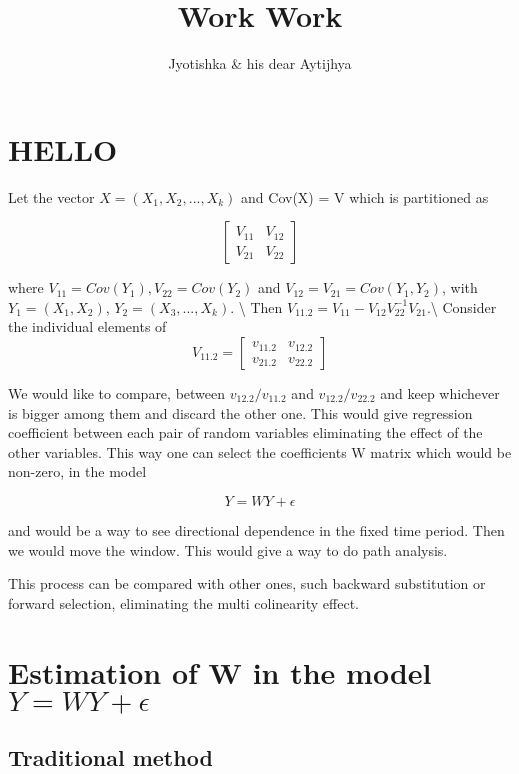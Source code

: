 \documentclass[
  12pt,
]{article}
\title{Work Work}
\author{Jyotishka \& his dear Aytijhya}
\date{}
\begin{document}
\maketitle


\hypertarget{hello}{%
\section{HELLO}\label{hello}}

Let the vector \(X = (X_1, X_2, . . . , X_k)\) and Cov(X) = V which is
partitioned as

\[\begin{bmatrix}
V_{11} & V_{12}\\
V_{21} & V_{22}
\end{bmatrix}\]

where \(V_{11} = Cov(Y_1), V_{22} = Cov(Y_2)\) and
\(V_{12} = V_{21} = Cov(Y_1, Y_2)\), with \(Y_1 = (X_1, X_2)\),
\(Y_2 = (X_3, . . . , X_k)\). \textbackslash{} Then
\(V_{11.2} = V_{11} - V_{12}V_{22}^{-1}V_{21}\).\textbackslash{}
Consider the individual elements of \[V_{11.2} =
\begin{bmatrix}
v_{11.2} & v_{12.2} \\
v_{21.2} & v_{22.2}
\end{bmatrix}\]

We would like to compare, between \(v_{12.2}/v_{11.2}\) and
\(v_{12.2}/v_{22.2}\) and keep whichever is bigger among them and
discard the other one. This would give regression coefficient between
each pair of random variables eliminating the effect of the other
variables. This way one can select the coefficients W matrix which would
be non-zero, in the model

\[Y = W Y + \epsilon\]

and would be a way to see directional dependence in the fixed time
period. Then we would move the window. This would give a way to do path
analysis.

This process can be compared with other ones, such backward substitution
or forward selection, eliminating the multi colinearity effect.

\section{\textbf{\textcolor{DeepBlue}{Estimation of W in the model $ Y=WY +\epsilon $}}}
\subsection{Traditional method}
\end{document}
